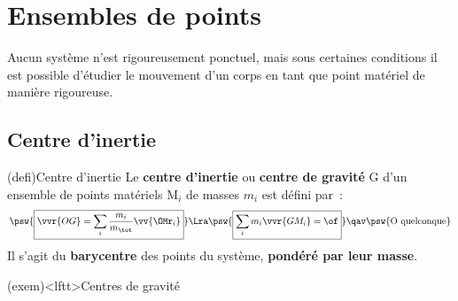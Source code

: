 \documentclass[../../main/main.tex]{subfiles}
\begin{document}
\section{Ensembles de points}
Aucun système n'est rigoureusement ponctuel, mais sous certaines conditions il
est possible d'étudier le mouvement d'un corps en tant que point matériel de
manière rigoureuse.

\subsection{Centre d'inertie}

\begin{tcb}(defi){Centre d'inertie}
	Le \textbf{centre d'inertie} ou \textbf{centre de gravité} G d'un ensemble
	de points matériels M$_i$ de masses $m_i$ est défini par~:
	\[
		\psw{%
			\boxed{\vvr{OG} = \sum_i \frac{m_i}{m_{\tot}} \vv{{\OMr}_i}}
		}
		\Lra
		\psw{%
			\boxed{\sum_i m_i \vvr{GM_i} = \of }
		}
		\qav
		\psw{%
			\text{O quelconque}
		}%
	\]
	Il s'agit du \textbf{barycentre} des points du système, \textbf{pondéré par
		leur masse}.
\end{tcb}

\begin{tcb}(exem)<lftt>{Centres de gravité}
	\begin{center}
		\vspace{-15pt}
	\end{center}
\end{tcb}
\end{document}
